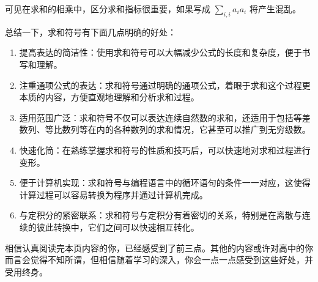可见在求和的相乘中，区分求和指标很重要，如果写成 $\sum\limits_{i,i} a_i a_i$ 将产生混乱。

总结一下，求和符号有下面几点明确的好处：

\begin{enumerate}
\item 提高表达的简洁性：使用求和符号可以大幅减少公式的长度和复杂度，便于书写和理解。
\item 注重通项公式的表达：求和符号通过明确的通项公式，着眼于求和这个过程更本质的内容，方便直观地理解和分析求和过程。
\item 适用范围广泛：求和符号不仅可以表达连续自然数的求和，还适用于包括等差数列、等比数列等在内的各种数列的求和情况，它甚至可以推广到无穷级数。
\item 快速化简：在熟练掌握求和符号的性质和技巧后，可以快速地对求和过程进行变形。
\item 便于计算机实现：求和符号与编程语言中的循环语句的条件一一对应，这使得计算过程可以容易转换为程序并通过计算机完成。
\item 与定积分的紧密联系：求和符号与定积分有着密切的关系，特别是在离散与连续的彼此转换中，它们之间可以快速相互转化。
\end{enumerate}

相信认真阅读完本页内容的你，已经感受到了前三点。其他的内容或许对高中的你而言会觉得不知所谓，但相信随着学习的深入，你会一点一点感受到这些好处，并受用终身。